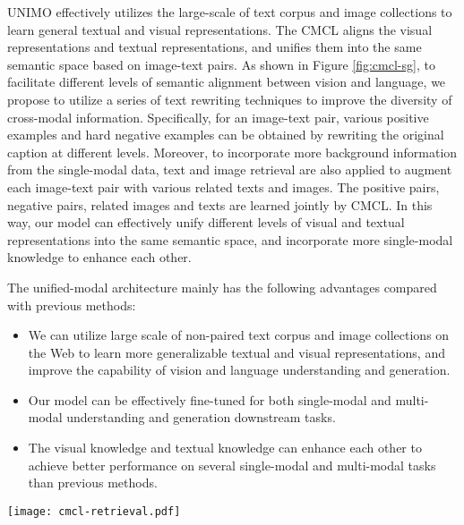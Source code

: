 \documentclass[11pt,a4paper]{article}
\begin{document}
UNIMO effectively utilizes the large-scale of text corpus and image collections to learn general textual and visual representations. 
The CMCL aligns the visual representations and textual representations, and unifies them into the same semantic space based on image-text pairs.
As shown in Figure \ref{fig:cmcl-sg}, to facilitate different levels of semantic alignment between vision and language, we propose to utilize a series of text rewriting techniques to improve the diversity of cross-modal information.
Specifically, for an image-text pair, various positive examples and hard negative examples can be obtained by rewriting the original caption at different levels.
Moreover, to incorporate more background information from the single-modal data, text and image retrieval are also applied to augment each image-text pair with various related texts and images.
The positive pairs, negative pairs, related images and texts are learned jointly by CMCL.
In this way, our model can effectively unify different levels of visual and textual representations into the same semantic space, and incorporate more single-modal knowledge to enhance each other.

The unified-modal architecture mainly has the following advantages compared with previous methods:
\begin{itemize}
\item We can utilize large scale of non-paired text corpus and image collections on the Web to learn more generalizable textual and visual representations, and improve the capability of vision and language understanding and generation.
\item Our model can be effectively fine-tuned for both single-modal and multi-modal understanding and generation downstream tasks.
\item The visual knowledge and textual knowledge can enhance each other to achieve better performance on several single-modal and multi-modal tasks than previous methods.
\end{itemize}









\begin{figure*}[t!]
	\centering
	\texttt{[image: cmcl-retrieval.pdf]}
	\caption{Illustration of the CMCL. A series of text rewriting techniques are utilized to create positive image-text pairs  and hard negative image-text pairs . Image and text retrieval are also utilized to obtain related images  and texts  from single-modal data, which are treated as single-modal positive samples during cross-modal learning. All of them are encoded by the same unified-modal Transformer in pairs or individually, and the representations of images and texts are extracted to compute the contrastive loss.}
	\label{fig:cmcl-sg}
\end{figure*}
\end{document}
